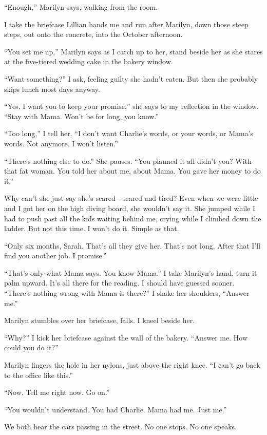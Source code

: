 \documentclass[
]{article}
\begin{document}
``Enough,'' Marilyn says, walking from the room.

I take the briefcase Lillian hands me and run after Marilyn, down those
steep steps, out onto the concrete, into the October afternoon.

``You set me up,'' Marilyn says as I catch up to her, stand beside her
as she stares at the five-tiered wedding cake in the bakery window.

``Want something?'' I ask, feeling guilty she hadn't eaten. But then she
probably skips lunch most days anyway.

``Yes. I want you to keep your promise,'' she says to my reflection in
the window. ``Stay with Mama. Won't be for long, you know.''

``Too long,'' I tell her. ``I don't want Charlie's words, or your words,
or Mama's words. Not anymore. I won't listen.''

``There's nothing else to do.'' She pauses. ``You planned it all didn't
you? With that fat woman. You told her about me, about Mama. You gave
her money to do it.''

Why can't she just say she's scared---scared and tired? Even when we
were little and I got her on the high diving board, she wouldn't say it.
She jumped while I had to push past all the kids waiting behind me,
crying while I climbed down the ladder. But not this time. I won't do
it. Simple as that.

``Only six months, Sarah. That's all they give her. That's not long.
After that I'll find you another job. I promise.''

``That's only what Mama says. You know Mama.'' I take Marilyn's hand,
turn it palm upward. It's all there for the reading. I should have
guessed sooner. ``There's nothing wrong with Mama is there?'' I shake
her shoulders, ``Answer me.''

Marilyn stumbles over her briefcase, falls. I kneel beside her.

``Why?'' I kick her briefcase against the wall of the bakery. ``Answer
me. How could you do it?''

Marilyn fingers the hole in her nylons, just above the right knee. ``I
can't go back to the office like this.''

``Now. Tell me right now. Go on.''

``You wouldn't understand. You had Charlie. Mama had me. Just me.''

We both hear the cars passing in the street. No one stops. No one
speaks.
\end{document}
